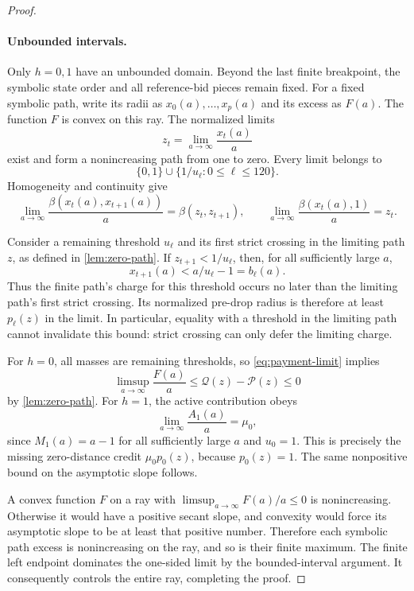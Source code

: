 \documentclass[11pt]{article}
\theoremstyle{definition}
\theoremstyle{remark}
\newcommand{\Qpath}{\mathcal Q}
\newcommand{\Ppath}{\mathcal P}
\begin{document}
\begin{proof}
\paragraph{Unbounded intervals.}
Only $h=0,1$ have an unbounded domain. Beyond the last finite breakpoint,
the symbolic state order and all reference-bid pieces remain fixed.
For a fixed symbolic path, write its radii as $x_0(a),\ldots,x_p(a)$ and
its excess as $F(a)$. The function $F$ is convex on this ray.
The normalized limits
\[
  z_t=\lim_{a\to\infty}\frac{x_t(a)}a
\]
exist and form a nonincreasing path from one to zero. Every limit belongs
to
\[
  \{0,1\}\cup\{1/u_\ell:0\le\ell\le120\}.
\]
Homogeneity and continuity give
\begin{equation}\label{eq:payment-limit}
  \lim_{a\to\infty}\frac{\beta(x_t(a),x_{t+1}(a))}{a}
     =\beta(z_t,z_{t+1}),\qquad
  \lim_{a\to\infty}\frac{\beta(x_t(a),1)}{a}=z_t.
\end{equation}

Consider a remaining threshold $u_\ell$ and its first strict crossing in the
limiting path $z$, as defined in \cref{lem:zero-path}.
If $z_{t+1}<1/u_\ell$, then, for all sufficiently large $a$,
\[
  x_{t+1}(a)<a/u_\ell-1=b_\ell(a).
\]
Thus the finite path's charge for this threshold occurs no later than the
limiting path's first strict crossing. Its normalized pre-drop radius is
therefore at least $p_\ell(z)$ in the limit. In particular, equality with a
threshold in the limiting path cannot invalidate this bound: strict
crossing can only defer the limiting charge.

For $h=0$, all masses are remaining thresholds, so
\eqref{eq:payment-limit} implies
\[
  \limsup_{a\to\infty}\frac{F(a)}a
     \le\Qpath(z)-\Ppath(z)\le0
\]
by \cref{lem:zero-path}.
For $h=1$, the active contribution obeys
\[
  \lim_{a\to\infty}\frac{A_1(a)}a=\mu_0,
\]
since $M_1(a)=a-1$ for all sufficiently large $a$ and $u_0=1$.
This is precisely the missing zero-distance credit
$\mu_0p_0(z)$, because $p_0(z)=1$.
The same nonpositive bound on the asymptotic slope follows.

A convex function $F$ on a ray with
$\limsup_{a\to\infty}F(a)/a\le0$ is nonincreasing.
Otherwise it would have a positive secant slope, and convexity would force
its asymptotic slope to be at least that positive number.
Therefore each symbolic path excess is nonincreasing on the ray, and so
is their finite maximum. The finite left endpoint dominates the one-sided
limit by the bounded-interval argument. It consequently controls the
entire ray, completing the proof.
\end{proof}
\end{document}
